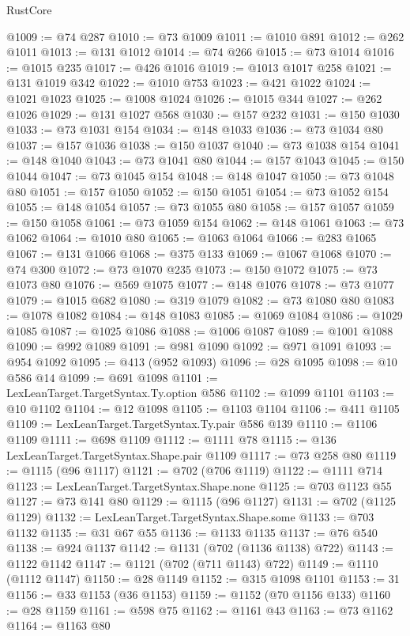 \begin{lexlean}{RustCore}
\begin{coremodule}
@1009 := @74 @287
@1010 := @73 @1009
@1011 := @1010 @891
@1012 := @262 @1011
@1013 := @131 @1012
@1014 := @74 @266
@1015 := @73 @1014
@1016 := @1015 @235
@1017 := @426 @1016
@1019 := @1013 @1017 @258
@1021 := @131 @1019 @342
@1022 := @1010 @753
@1023 := @421 @1022
@1024 := @1021 @1023
@1025 := @1008 @1024
@1026 := @1015 @344
@1027 := @262 @1026
@1029 := @131 @1027 @568
@1030 := @157 @232
@1031 := @150 @1030
@1033 := @73 @1031 @154
@1034 := @148 @1033
@1036 := @73 @1034 @80
@1037 := @157 @1036
@1038 := @150 @1037
@1040 := @73 @1038 @154
@1041 := @148 @1040
@1043 := @73 @1041 @80
@1044 := @157 @1043
@1045 := @150 @1044
@1047 := @73 @1045 @154
@1048 := @148 @1047
@1050 := @73 @1048 @80
@1051 := @157 @1050
@1052 := @150 @1051
@1054 := @73 @1052 @154
@1055 := @148 @1054
@1057 := @73 @1055 @80
@1058 := @157 @1057
@1059 := @150 @1058
@1061 := @73 @1059 @154
@1062 := @148 @1061
@1063 := @73 @1062
@1064 := @1010 @80
@1065 := @1063 @1064
@1066 := @283 @1065
@1067 := @131 @1066
@1068 := @375 @133
@1069 := @1067 @1068
@1070 := @74 @300
@1072 := @73 @1070 @235
@1073 := @150 @1072
@1075 := @73 @1073 @80
@1076 := @569 @1075
@1077 := @148 @1076
@1078 := @73 @1077
@1079 := @1015 @682
@1080 := @319 @1079
@1082 := @73 @1080 @80
@1083 := @1078 @1082
@1084 := @148 @1083
@1085 := @1069 @1084
@1086 := @1029 @1085
@1087 := @1025 @1086
@1088 := @1006 @1087
@1089 := @1001 @1088
@1090 := @992 @1089
@1091 := @981 @1090
@1092 := @971 @1091
@1093 := @954 @1092
@1095 := @413 (@952 @1093)
@1096 := @28 @1095
@1098 := @10 @586 @14
@1099 := @691 @1098
@1101 := LexLeanTarget.TargetSyntax.Ty.option @586
@1102 := @1099 @1101
@1103 := @10 @1102
@1104 := @12 @1098
@1105 := @1103 @1104
@1106 := @411 @1105
@1109 := LexLeanTarget.TargetSyntax.Ty.pair @586 @139
@1110 := @1106 @1109
@1111 := @698 @1109
@1112 := @1111 @78
@1115 := @136 LexLeanTarget.TargetSyntax.Shape.pair @1109
@1117 := @73 @258 @80
@1119 := @1115 (@96 @1117)
@1121 := @702 (@706 @1119)
@1122 := @1111 @714
@1123 := LexLeanTarget.TargetSyntax.Shape.none
@1125 := @703 @1123 @55
@1127 := @73 @141 @80
@1129 := @1115 (@96 @1127)
@1131 := @702 (@1125 @1129)
@1132 := LexLeanTarget.TargetSyntax.Shape.some
@1133 := @703 @1132
@1135 := @31 @67 @55
@1136 := @1133 @1135
@1137 := @76 @540
@1138 := @924 @1137
@1142 := @1131 (@702 (@1136 @1138) @722)
@1143 := @1122 @1142
@1147 := @1121 (@702 (@711 @1143) @722)
@1149 := @1110 (@1112 @1147)
@1150 := @28 @1149
@1152 := @315 @1098 @1101
@1153 := 31
@1156 := @33 @1153 (@36 @1153)
@1159 := @1152 (@70 @1156 @133)
@1160 := @28 @1159
@1161 := @598 @75
@1162 := @1161 @43
@1163 := @73 @1162
@1164 := @1163 @80

\end{coremodule}
\end{lexlean}
